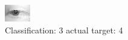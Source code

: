 \begin{figure}[h!]
\begin{center}
\includegraphics[width=0.60\columnwidth]{figures/ID2637_class_3_target_4.png}
\end{center}
\caption{ Classification: 3 actual target: 4}
\label{fig:ID2637_class_3_target_4}
\end{figure}
